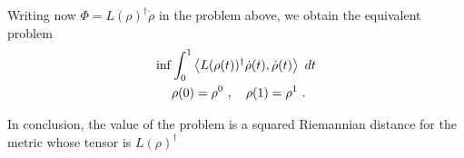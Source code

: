 \documentclass[12pt,a4paper]{amsart}
\theoremstyle{definition}
\begin{document}
Writing now $\Phi = L(\rho)^\dagger \dot \rho$ in the problem above,
we obtain the equivalent problem
\begin{align*}
 \inf &\int_0^1 \left\langle L(\rho(t))^\dagger \dot \rho(t),\dot \rho(t)\right\rangle \ dt
 \\
 &\rho(0) = \rho^0 \ , \quad \rho(1) = \rho^1 \ .
\end{align*}

In conclusion, the value of the problem is a squared Riemannian
distance for the metric whose tensor is $L(\rho)^\dagger$



\end{document}

